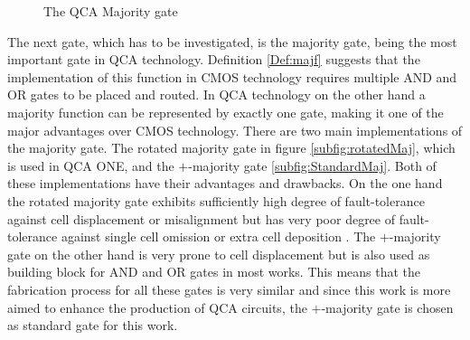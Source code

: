 \begin{figure}
{ 
		\label{subfig:StandardOr}
	}
	\caption{The QCA Majority gate} \label{fig:QCAMaj}
\end{figure}
The next gate, which has to be investigated, is the majority gate, being the most important gate in QCA technology. Definition \ref{Def:majf} suggests that the implementation of this function in CMOS technology requires multiple AND and OR gates to be placed and routed. In QCA technology on the other hand a majority function can be represented by exactly one gate, making it one of the major advantages over CMOS technology. There are two main implementations of the majority gate. The rotated majority gate in figure \ref{subfig:rotatedMaj}, which is used in QCA ONE, and the $+$-majority gate \ref{subfig:StandardMaj}. Both of these implementations have their advantages and drawbacks. On the one hand the rotated majority gate exhibits sufficiently high degree of fault-tolerance against cell displacement or misalignment but has very poor degree of fault-tolerance against single cell omission or extra cell deposition \cite{majorityrotated}. The $+$-majority gate on the other hand is very prone to cell displacement but is also used as building block for AND and OR gates in most works. This means that the fabrication process for all these gates is very similar and since this work is more aimed to enhance the production of QCA circuits, the $+$-majority gate is chosen as standard gate for this work.\\
